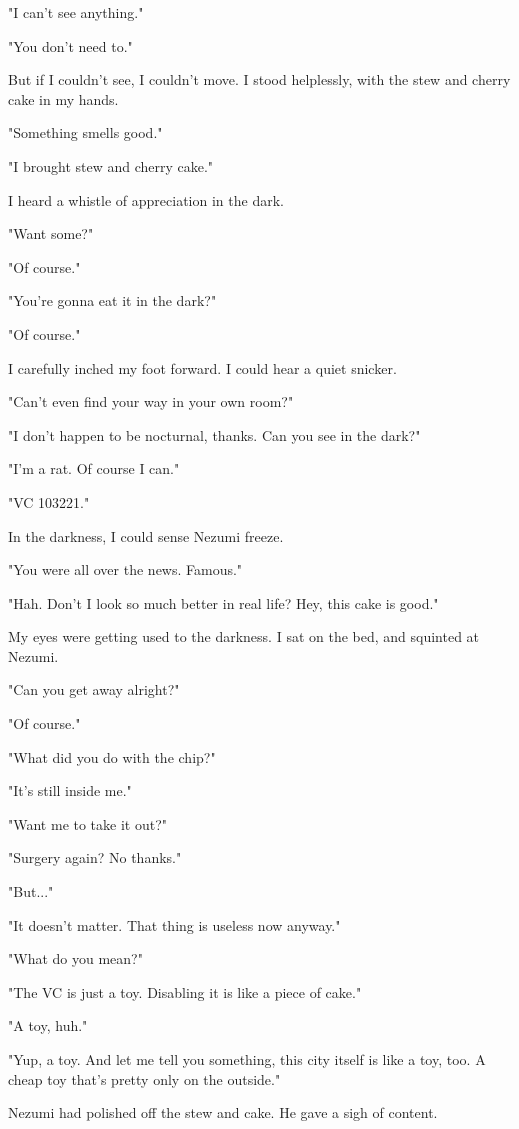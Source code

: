 "I can't see anything."

"You don't need to."

But if I couldn't see, I couldn't move. I stood helplessly, with the
stew and cherry cake in my hands.

"Something smells good."

"I brought stew and cherry cake."

I heard a whistle of appreciation in the dark.

"Want some?"

"Of course."

"You're gonna eat it in the dark?"

"Of course."

I carefully inched my foot forward. I could hear a quiet snicker.

"Can't even find your way in your own room?"

"I don't happen to be nocturnal, thanks. Can you see in the dark?"

"I'm a rat. Of course I can."

"VC 103221."

In the darkness, I could sense Nezumi freeze.

"You were all over the news. Famous."

"Hah. Don't I look so much better in real life? Hey, this cake is good."

My eyes were getting used to the darkness. I sat on the bed, and
squinted at Nezumi.

"Can you get away alright?"

"Of course."

"What did you do with the chip?"

"It's still inside me."

"Want me to take it out?"

"Surgery again? No thanks."

"But..."

"It doesn't matter. That thing is useless now anyway."

"What do you mean?"

"The VC is just a toy. Disabling it is like a piece of cake."

"A toy, huh."

"Yup, a toy. And let me tell you something, this city itself is like a
toy, too. A cheap toy that's pretty only on the outside."

Nezumi had polished off the stew and cake. He gave a sigh of content.

